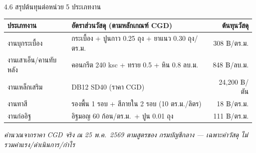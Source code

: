 \documentclass[aspectratio=169,11pt]{beamer}
\begin{document}
\begin{frame}{4.6 สรุปต้นทุนต่อหน่วย 5 ประเภทงาน}
  \footnotesize
  \begin{table}
    \centering
    \begin{tabularx}{\textwidth}{l X r}
      \toprule
      \textbf{ประเภทงาน} & \textbf{อัตราส่วนวัสดุ (ตามหลักเกณฑ์ CGD)} & \textbf{ต้นทุนวัสดุ} \\
      \midrule
      งานบุกระเบื้อง       & กระเบื้อง $+$ ปูนกาว 0.25 ถุง $+$ ยาแนว 0.30 ถุง/ตร.ม. & 308 ฿/ตร.ม. \\
      งานเสาเอ็น/คานทับหลัง & คอนกรีต 240 ksc + ทราย 0.5 + หิน 0.8 ลบ.ม.            & 848 ฿/ลบ.ม. \\
      งานเหล็กเสริม         & DB12 SD40 (ราคา CGD)                                 & 24{,}200 ฿/ตัน \\
      งานทาสี              & รองพื้น 1 รอบ + สีภายใน 2 รอบ (10 ตร.ม./ลิตร)         & 18 ฿/ตร.ม. \\
      งานก่ออิฐ            & อิฐมอญ 60 ก้อน/ตร.ม.\ + ปูน 0.01 ถุง                  & 111 ฿/ตร.ม. \\
      \bottomrule
    \end{tabularx}
  \end{table}
  \vspace{0.3em}
  \footnotesize\emph{คำนวณจากราคา CGD จริง ณ 25 พ.ค.~2569 ตามสูตรของ
  กรมบัญชีกลาง --- เฉพาะค่าวัสดุ ไม่รวมค่าแรง/ดำเนินการ/กำไร}
\end{frame}
\end{document}
